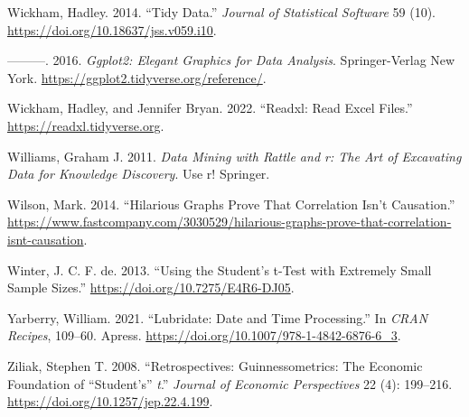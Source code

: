 \documentclass[
]{article}
\newlength{\cslhangindent}
\newlength{\cslentryspacingunit} %
\newenvironment{CSLReferences}[2] %
 {%
  \setlength{\parindent}{0pt}
  \ifodd #1
  \let\oldpar\par
  \def\par{\hangindent=\cslhangindent\oldpar}
  \fi
  \setlength{\parskip}{#2\cslentryspacingunit}
 }%
 {}
\begin{document}
\begin{CSLReferences}{1}{0}
\leavevmode{}%
Wickham, Hadley. 2014. {``Tidy Data.''} \emph{Journal of Statistical Software} 59 (10). \url{https://doi.org/10.18637/jss.v059.i10}.

\leavevmode{}%
---------. 2016. \emph{Ggplot2: Elegant Graphics for Data Analysis}. Springer-Verlag New York. \url{https://ggplot2.tidyverse.org/reference/}.

\leavevmode{}%
Wickham, Hadley, and Jennifer Bryan. 2022. {``Readxl: Read Excel Files.''} \url{https://readxl.tidyverse.org}.

\leavevmode{}%
Williams, Graham J. 2011. \emph{Data Mining with Rattle and r: The Art of Excavating Data for Knowledge Discovery}. Use r! Springer.

\leavevmode{}%
Wilson, Mark. 2014. {``Hilarious Graphs Prove That Correlation Isn{'}t Causation.''} \url{https://www.fastcompany.com/3030529/hilarious-graphs-prove-that-correlation-isnt-causation}.

\leavevmode{}%
Winter, J. C. F. de. 2013. {``Using the Student's t-Test with Extremely Small Sample Sizes.''} \url{https://doi.org/10.7275/E4R6-DJ05}.

\leavevmode{}%
Yarberry, William. 2021. {``Lubridate: Date and Time Processing.''} In \emph{{CRAN} Recipes}, 109--60. Apress. \url{https://doi.org/10.1007/978-1-4842-6876-6_3}.

\leavevmode{}%
Ziliak, Stephen T. 2008. {``Retrospectives: Guinnessometrics: The Economic Foundation of {``}Student's{''} {\emph{t}}.''} \emph{Journal of Economic Perspectives} 22 (4): 199--216. \url{https://doi.org/10.1257/jep.22.4.199}.

\end{CSLReferences}
\end{document}
